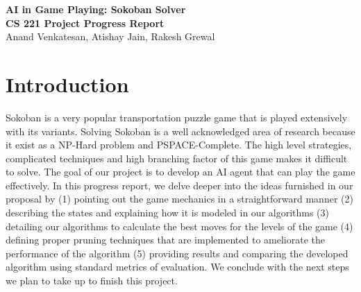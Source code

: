 \documentclass[10pt, final]{article}
\begin{document}
	\begin{center}
		\LARGE{\textbf{AI in Game Playing: Sokoban Solver}}\\
		\Large{\textbf{CS 221 Project Progress Report}}\\
		\Large{Anand Venkatesan, Atishay Jain, Rakesh Grewal }
	\end{center}
	
	\section{Introduction}
	Sokoban is a very popular transportation puzzle game that is played extensively with its variants. Solving Sokoban is a well acknowledged area of research because it exist as a NP-Hard problem and PSPACE-Complete. The high level strategies, complicated techniques and high branching factor of this game makes it difficult to solve. The goal of our project is to develop an AI agent that can play the game effectively. In this progress report, we delve deeper into the ideas furnished in our proposal by (1) pointing out the game mechanics in a straightforward manner (2) describing the states and explaining how it is modeled in our algorithms (3) detailing our algorithms to calculate the best moves for the levels of the game (4) defining proper pruning techniques that are implemented to ameliorate the performance of the algorithm (5) providing results and comparing the developed algorithm using standard metrics of evaluation. We conclude with the next steps we plan to take up to finish this project.
	
\end{document}
